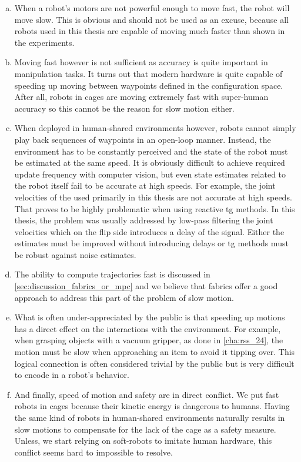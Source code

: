 \begin{enumerate}[(a)]
  \item When a robot's motors are not powerful enough to
    move fast, the robot will move slow. This is obvious and
    should not be used as an excuse, because all robots used
    in this thesis are capable of moving much faster than
    shown in the experiments. 
  \item Moving fast however is not sufficient as accuracy
    is quite important in manipulation tasks. It turns out
    that modern hardware is quite capable of speeding up
    moving between waypoints defined in the configuration
    space. After all,
    robots in cages are moving extremely fast with
    super-human accuracy so this cannot be the reason for
    slow motion either.
  \item When deployed in human-shared environments however,
    robots cannot simply play back sequences of waypoints in
    an open-loop manner. Instead, the environment has to be
    constantly perceived and the state of the robot must be
    estimated at the same speed. It is obviously difficult
    to achieve required update frequency with computer
    vision, but even state estimates related to the robot
    itself fail to be accurate at high speeds. For example,
    the joint velocities of the \panda{} used primarily
    in this thesis are not accurate at high speeds. That
    proves to be highly problematic when using reactive
    \ac{tg} methods. In this thesis, the problem was usually
    addressed by low-pass filtering the joint velocities
    which on the flip side introduces a delay of the signal.
    Either the estimates must be improved without
    introducing delays or \ac{tg} methods must be robust
    against noise estimates.
  \item The ability to compute trajectories fast is
    discussed in \cref{sec:discussion_fabrics_or_mpc} and we
    believe that \ac{fabrics} offer a good approach to
    address this part of the problem of slow motion.
  \item What is often under-appreciated by the public is
    that speeding up motions has a direct effect on the
    interactions with the environment. For example, when
    grasping objects with a vacuum gripper, as done in 
    \cref{cha:rss_24}, the motion must be slow when
    approaching an item to avoid it tipping over. This
    logical connection is often considered trivial by the
    public but is very difficult to encode in a robot's
    behavior.
  \item And finally, speed of motion and safety are in direct
    conflict. We put fast robots in cages because their
    kinetic energy is dangerous to humans. Having the same
    kind of robots in human-shared environments naturally 
    results in slow motions to compensate for the lack of
    the cage as a safety measure. Unless, we start relying
    on soft-robots to imitate human hardware, this conflict
    seems hard to impossible to resolve.
\end{enumerate}


